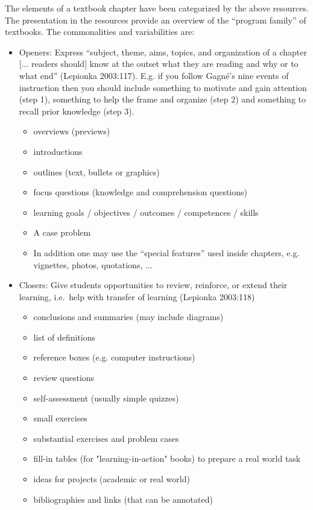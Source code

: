 \documentclass[12pt]{article}
\begin{document}
The elements of a textbook chapter have been categorized by the above resources.
The presentation in the resources provide an overview of the ``program family''
of textbooks.  The commonalities and variabilities are:

\begin{itemize}
\item Openers: Express ``subject, theme, aims, topics, and organization of a
  chapter [... readers should] know at the outset what they are reading and why
  or to what end'' (Lepionka 2003:117). E.g. if you follow Gagné's nine events
  of instruction then you should include something to motivate and gain
  attention (step 1), something to help the frame and organize (step 2) and
  something to recall prior knowledge (step 3).
  \begin{itemize}
  \item overviews (previews)
  \item introductions
  \item outlines (text, bullets or graphics)
  \item focus questions (knowledge and comprehension questions)
  \item learning goals / objectives / outcomes / competences / skills
  \item A case problem
  \item In addition one may use the ``special features'' used inside chapters,
    e.g. vignettes, photos, quotations, ...
  \end{itemize}
\item Closers: Give students opportunities to review, reinforce, or extend their
  learning, i.e.\ help with transfer of learning (Lepionka 2003:118)
  \begin{itemize}
  \item conclusions and summaries (may include diagrams)
  \item list of definitions
  \item reference boxes (e.g. computer instructions)
  \item review questions
  \item self-assessment (usually simple quizzes)
  \item small exercises
  \item substantial exercises and problem cases
  \item fill-in tables (for "learning-in-action" books) to prepare a real world
    task
  \item ideas for projects (academic or real world)
  \item bibliographies and links (that can be annotated)

\end{itemize}
\end{itemize}
\end{document}
